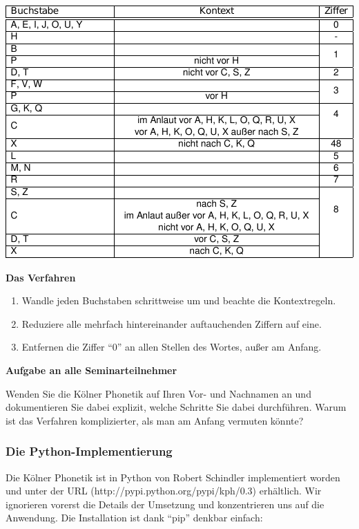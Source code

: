 \includegraphics[width=\textwidth]{img/kphon.pdf}


\par\noindent\textbf{Das Verfahren}

\begin{enumerate}
\itemsep1pt\parskip0pt
\item
  Wandle jeden Buchstaben schrittweise um und beachte die Kontextregeln.
\item
  Reduziere alle mehrfach hintereinander auftauchenden Ziffern auf eine.
\item
  Entfernen die Ziffer ``0'' an allen Stellen des Wortes, außer am
  Anfang.
\end{enumerate}


\par\noindent\textbf{Aufgabe an alle Seminarteilnehmer}

Wenden Sie die Kölner Phonetik auf Ihren Vor- und Nachnamen an und
dokumentieren Sie dabei explizit, welche Schritte Sie dabei durchführen.
Warum ist das Verfahren komplizierter, als man am Anfang vermuten
könnte?


\subsubsection{\texorpdfstring{{Die
Python-Implementierung}}{Die Python-Implementierung}}

Die Kölner Phonetik ist in Python von Robert Schindler implementiert
worden und unter der URL (http://pypi.python.org/pypi/kph/0.3)
erhältlich. Wir ignorieren vorerst die Details der Umsetzung und
konzentrieren uns auf die Anwendung. Die Installation ist dank ``pip''
denkbar einfach:

